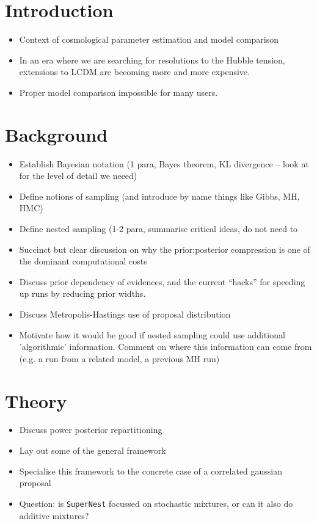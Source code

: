 \documentclass[usenatbib]{mnras}
\begin{document}
\section{Introduction}\label{sec:introduction}

\begin{itemize}
    \item Context of cosmological parameter estimation and model comparison
	\item In an era where we are searching for resolutions to the Hubble tension, extensions to LCDM are becoming more and more expensive. 
	\item Proper model comparison impossible for many users.
\end{itemize}

\section{Background}\label{sec:background}

\begin{itemize}
    \item Establish Bayesian notation (1 para, Bayes theorem, KL divergence -- look at \citet{2019PhRvD.100d3504H} for the level of detail we neeed)
    \item Define notions of sampling (and introduce by name things like Gibbs, MH, HMC)
    \item Define nested sampling (1-2 para, summarise critical ideas, do not need to 
    \item Succinct but clear discussion on why the prior:posterior compression is one of the dominant computational costs
    \item Discuss prior dependency of evidences, and the current ``hacks'' for speeding up runs by reducing prior widths.
    \item Discuss Metropolis-Hastings use of proposal distribution
    \item Motivate how it would be good if nested sampling could use additional 'algorithmic' information. Comment on where this information can come from (e.g. a run from a related model, a previous MH run)
\end{itemize}

\section{Theory}\label{sec:theory}

\begin{itemize}
    \item Discuss power posterior repartitioning 
    \item Lay out some of the general framework
    \item Specialise this framework to the concrete case of a correlated gaussian proposal
    \item Question: is \texttt{SuperNest} focussed on stochastic mixtures, or can it also do additive mixtures?
\end{itemize}
\end{document}
